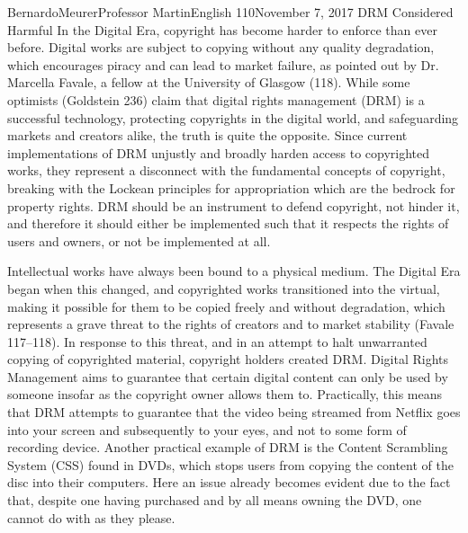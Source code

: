 \documentclass[12pt,letterpaper]{article}
\begin{document}
    \begin{mla}{Bernardo}{Meurer}{Professor Martin}{English 110}{November 7, 2017}%
        {DRM Considered Harmful}
        In the Digital Era, copyright has become harder to enforce than ever before. Digital works are subject to copying without any quality degradation, which encourages piracy and can lead to market failure, as pointed out by Dr. Marcella Favale, a fellow at the University of Glasgow (118). While some optimists (Goldstein 236) claim that digital rights management (DRM) is a successful technology, protecting copyrights in the digital world, and safeguarding markets and creators alike, the truth is quite the opposite. Since current implementations of DRM unjustly and broadly harden access to copyrighted works, they represent a disconnect with the fundamental concepts of copyright, breaking with the Lockean principles for appropriation which are the bedrock for property rights. DRM should be an instrument to defend copyright, not hinder it, and therefore it should either be implemented such that it respects the rights of users and owners, or not be implemented at all.

        Intellectual works have always been bound to a physical medium. The Digital Era began when this changed, and copyrighted works transitioned into the virtual, making it possible for them to be copied freely and without degradation, which represents a grave threat to the rights of creators and to market stability (Favale 117--118). In response to this threat, and in an attempt to halt unwarranted copying of copyrighted material, copyright holders created DRM. Digital Rights Management aims to guarantee that certain digital content can only be used by someone insofar as the copyright owner allows them to. Practically, this means that DRM attempts to guarantee that the video being streamed from Netflix goes into your screen and subsequently to your eyes, and not to some form of recording device. Another practical example of DRM is the Content Scrambling System (CSS) found in DVDs, which stops users from copying the content of the disc into their computers. Here an issue already becomes evident due to the fact that, despite one having purchased and by all means owning the DVD, one cannot do with as they please.


\end{mla}
\end{document}
